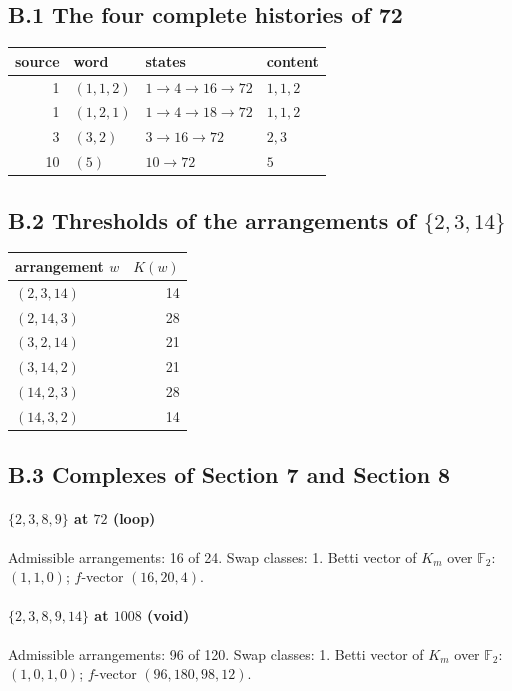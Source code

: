\subsection*{B.1 The four complete histories of 72}
\begin{center}\small\begin{tabular}{@{}rlll@{}}\toprule source & word & states & content\\\midrule
1 & $(1,1,2)$ & $1\to 4\to 16\to 72$ & $1, 1, 2$\\
1 & $(1,2,1)$ & $1\to 4\to 18\to 72$ & $1, 1, 2$\\
3 & $(3,2)$ & $3\to 16\to 72$ & $2, 3$\\
10 & $(5)$ & $10\to 72$ & $5$\\
\bottomrule\end{tabular}\end{center}
\subsection*{B.2 Thresholds of the arrangements of $\{2,3,14\}$}
\begin{center}\small\begin{tabular}{@{}lr@{}}\toprule arrangement $w$ & $K(w)$\\\midrule
$(2,3,14)$ & 14\\
$(2,14,3)$ & 28\\
$(3,2,14)$ & 21\\
$(3,14,2)$ & 21\\
$(14,2,3)$ & 28\\
$(14,3,2)$ & 14\\
\bottomrule\end{tabular}\end{center}
\subsection*{B.3 Complexes of Section 7 and Section 8}
\paragraph{$\{2,3,8,9\}$ at $72$ (loop)}Admissible arrangements: 16 of 24. Swap classes: 1. Betti vector of $K_m$ over $\mathbb F_2$: $(1,1,0)$; $f$-vector $(16,20,4)$.
\paragraph{$\{2,3,8,9,14\}$ at $1008$ (void)}Admissible arrangements: 96 of 120. Swap classes: 1. Betti vector of $K_m$ over $\mathbb F_2$: $(1,0,1,0)$; $f$-vector $(96,180,98,12)$.
